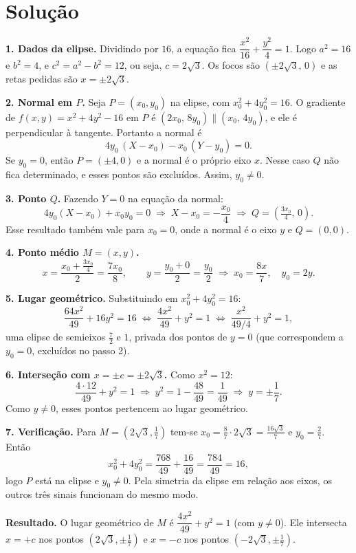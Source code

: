\documentclass{article}%
\begin{document}
\section*{Solução}

\textbf{1. Dados da elipse.} Dividindo por $16$, a equação fica $\dfrac{x^2}{16}+\dfrac{y^2}{4}=1$. Logo $a^2=16$ e $b^2=4$, e $c^2=a^2-b^2=12$, ou seja, $c=2\sqrt3$. Os focos são $(\pm 2\sqrt3,\,0)$ e as retas pedidas são $x=\pm 2\sqrt3$.

\textbf{2. Normal em $P$.} Seja $P=(x_0,y_0)$ na elipse, com $x_0^2+4y_0^2=16$. O gradiente de $f(x,y)=x^2+4y^2-16$ em $P$ é $(2x_0,\,8y_0)\parallel(x_0,\,4y_0)$, e ele é perpendicular à tangente. Portanto a normal é
\[
4y_0\,(X-x_0)-x_0\,(Y-y_0)=0 .
\]
Se $y_0=0$, então $P=(\pm4,0)$ e a normal é o próprio eixo $x$. Nesse caso $Q$ não fica determinado, e esses pontos são excluídos. Assim, $y_0\neq0$.

\textbf{3. Ponto $Q$.} Fazendo $Y=0$ na equação da normal:
\[
4y_0(X-x_0)+x_0y_0=0 \;\Longrightarrow\; X-x_0=-\frac{x_0}{4}\;\Longrightarrow\; Q=\left(\tfrac{3x_0}{4},\,0\right).
\]
Esse resultado também vale para $x_0=0$, onde a normal é o eixo $y$ e $Q=(0,0)$.

\textbf{4. Ponto médio $M=(x,y)$.}
\[
x=\frac{x_0+\frac{3x_0}{4}}{2}=\frac{7x_0}{8},\qquad y=\frac{y_0+0}{2}=\frac{y_0}{2}
\;\Longrightarrow\; x_0=\frac{8x}{7},\quad y_0=2y .
\]

\textbf{5. Lugar geométrico.} Substituindo em $x_0^2+4y_0^2=16$:
\[
\frac{64x^2}{49}+16y^2=16 \;\Longleftrightarrow\; \frac{4x^2}{49}+y^2=1 \;\Longleftrightarrow\; \frac{x^2}{49/4}+y^2=1 ,
\]
uma elipse de semieixos $\tfrac72$ e $1$, privada dos pontos de $y=0$ (que correspondem a $y_0=0$, excluídos no passo 2).

\textbf{6. Interseção com $x=\pm c=\pm2\sqrt3$.} Como $x^2=12$:
\[
\frac{4\cdot12}{49}+y^2=1\;\Longrightarrow\; y^2=1-\frac{48}{49}=\frac1{49}\;\Longrightarrow\; y=\pm\frac17 .
\]
Como $y\ne0$, esses pontos pertencem ao lugar geométrico.

\textbf{7. Verificação.} Para $M=\left(2\sqrt3,\tfrac17\right)$ tem-se $x_0=\tfrac{8}{7}\cdot2\sqrt3=\tfrac{16\sqrt3}{7}$ e $y_0=\tfrac27$. Então
\[
x_0^2+4y_0^2=\frac{768}{49}+\frac{16}{49}=\frac{784}{49}=16 ,
\]
logo $P$ está na elipse e $y_0\neq0$. Pela simetria da elipse em relação aos eixos, os outros três sinais funcionam do mesmo modo.

\textbf{Resultado.} O lugar geométrico de $M$ é $\dfrac{4x^2}{49}+y^2=1$ (com $y\neq0$). Ele intersecta $x=+c$ nos pontos $\left(2\sqrt3,\pm\tfrac17\right)$ e $x=-c$ nos pontos $\left(-2\sqrt3,\pm\tfrac17\right)$.
\end{document}
